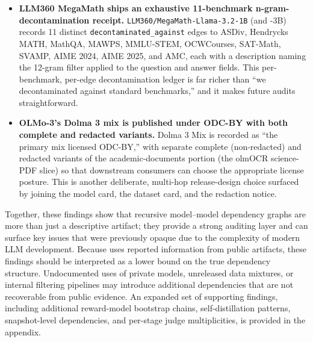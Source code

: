 \begin{itemize}
    \item \textbf{LLM360 MegaMath ships an exhaustive 11-benchmark n-gram-decontamination receipt.}
    \texttt{LLM360/MegaMath-Llama-3.2-1B} (and -3B) records 11 distinct \texttt{decontaminated\_against} edges to ASDiv, Hendrycks MATH, MathQA, MAWPS, MMLU-STEM, OCWCourses, SAT-Math, SVAMP, AIME 2024, AIME 2025, and AMC, each with a description naming the 12-gram filter applied to the question and answer fields. This per-benchmark, per-edge decontamination ledger is far richer than ``we decontaminated against standard benchmarks,'' and it makes future audits straightforward.

    \item \textbf{OLMo-3's Dolma 3 mix is published under ODC-BY with both complete and redacted variants.}
    Dolma 3 Mix is recorded as ``the primary mix licensed ODC-BY,'' with separate complete (non-redacted) and redacted variants of the academic-documents portion (the olmOCR science-PDF slice) so that downstream consumers can choose the appropriate license posture. This is another deliberate, multi-hop release-design choice surfaced by joining the model card, the dataset card, and the redaction notice.
\end{itemize}

\medskip

\noindent
Together, these findings show that recursive model--model dependency graphs are more than just a descriptive artifact; they provide a strong auditing layer and can surface key issues that were previously opaque due to the complexity of modern LLM development. Because \system{} uses reported information from public artifacts, these findings should be interpreted as a lower bound on the true dependency structure. Undocumented uses of private models, unreleased data mixtures, or internal filtering pipelines may introduce additional dependencies that are not recoverable from public evidence. An expanded set of supporting findings, including additional reward-model bootstrap chains, self-distillation patterns, snapshot-level dependencies, and per-stage judge multiplicities, is provided in the appendix.
